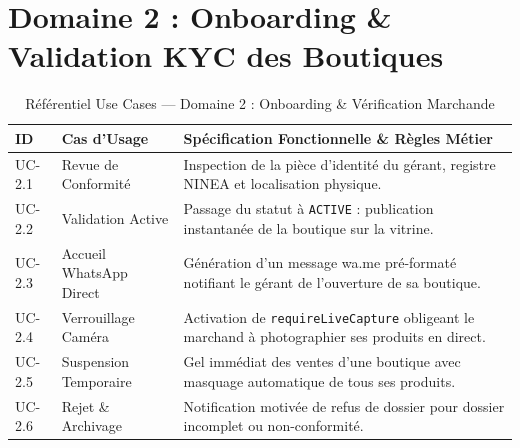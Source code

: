 \documentclass[11pt,a4paper,titlepage]{report}
\begin{document}
\section{Domaine 2 : Onboarding \& Validation KYC des Boutiques}
\begin{table}[h!]
\centering
\small
\begin{tabularx}{\textwidth}{@{}llX@{}}
\toprule
\rowcolor{tableheader}
\textbf{ID} & \textbf{Cas d'Usage} & \textbf{Spécification Fonctionnelle \& Règles Métier} \\
\midrule
UC-2.1 & Revue de Conformité & Inspection de la pièce d'identité du gérant, registre NINEA et localisation physique. \\
UC-2.2 & Validation Active & Passage du statut à \texttt{ACTIVE} : publication instantanée de la boutique sur la vitrine. \\
UC-2.3 & Accueil WhatsApp Direct & Génération d'un message wa.me pré-formaté notifiant le gérant de l'ouverture de sa boutique. \\
UC-2.4 & Verrouillage Caméra & Activation de \texttt{requireLiveCapture} obligeant le marchand à photographier ses produits en direct. \\
UC-2.5 & Suspension Temporaire & Gel immédiat des ventes d'une boutique avec masquage automatique de tous ses produits. \\
UC-2.6 & Rejet \& Archivage & Notification motivée de refus de dossier pour dossier incomplet ou non-conformité. \\
\bottomrule
\end{tabularx}
\caption{Référentiel Use Cases — Domaine 2 : Onboarding \& Vérification Marchande}
\end{table}
\end{document}
